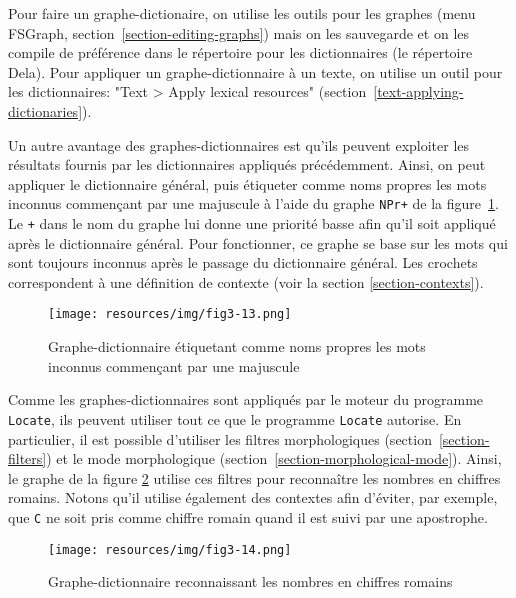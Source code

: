 \bigskip
\noindent Pour faire un graphe-dictionaire, on utilise les outils pour les graphes (menu FSGraph, section~\ref{section-editing-graphs})
mais on les sauvegarde et on les compile de préférence dans le répertoire pour les dictionnaires (le répertoire Dela).
Pour appliquer un graphe-dictionnaire à un texte, on utilise un outil pour les dictionnaires: "Text > Apply lexical resources" (section~\ref{text-applying-dictionaries}).
\bigskip

\noindent Un autre avantage des graphes-dictionnaires est qu’ils peuvent exploiter les résultats
fournis par les dictionnaires appliqués précédemment. Ainsi, on peut appliquer le dictionnaire
général, puis étiqueter comme noms propres les mots inconnus commençant par une majuscule à l’aide
du graphe \verb$NPr+$ de la figure~\ref{graph-NPr}. Le \verb$+$ dans le nom du graphe lui donne une
priorité basse afin qu’il soit appliqué après le dictionnaire général. Pour fonctionner, ce graphe
se base sur les mots qui sont toujours inconnus après le passage du dictionnaire général. Les
crochets correspondent à une définition de contexte (voir la section \ref{section-contexts}).

\begin{figure}[!ht]
\begin{center}
\texttt{[image: resources/img/fig3-13.png]}
\caption{Graphe-dictionnaire étiquetant comme noms propres les mots inconnus commençant par une
majuscule
\label{graph-NPr}}
\end{center}
\end{figure}

\bigskip
\noindent Comme les graphes-dictionnaires sont appliqués par le moteur du programme \verb+Locate+,
ils peuvent utiliser tout ce que le programme \verb+Locate+ autorise. En particulier, il est
possible d’utiliser les filtres morphologiques (section~\ref{section-filters}) et le mode morphologique (section~\ref{section-morphological-mode}).
Ainsi, le graphe de la figure \ref{graph-CR} utilise ces filtres pour reconnaître les nombres en
chiffres romains. Notons qu’il utilise également des contextes afin d’éviter, par exemple, que
\verb+C+ ne soit pris comme chiffre romain quand il est suivi par une apostrophe.

\begin{figure}[!p]
\begin{center}
\texttt{[image: resources/img/fig3-14.png]}
\caption{Graphe-dictionnaire reconnaissant les nombres en chiffres romains\label{graph-CR}}
\end{center}
\end{figure}

